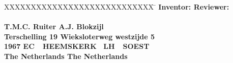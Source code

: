 \begin{tabbing}
XXXXXXXXXXXXXXXXXXXXXXXXXXXX \= \kill
\bfseries Inventor: \> \bfseries Reviewer: \\
\\
T.M.C. Ruiter \> A.J. Blokzijl\\
Terschelling 19 \> Wieksloterweg westzijde 5\\
1967 EC\ \ HEEMSKERK \ LH\ \ SOEST\\
The Netherlands \> The Netherlands\\
\end{tabbing}
